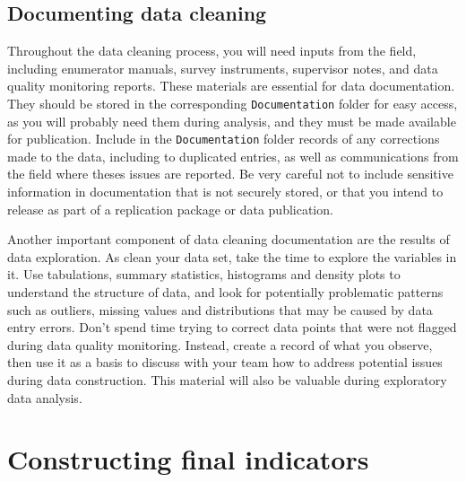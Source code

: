 \subsection{Documenting data cleaning}

Throughout the data cleaning process, you will need inputs from the field,
including enumerator manuals, survey instruments,
supervisor notes, and data quality monitoring reports.
These materials are essential for data documentation.
They should be stored in the corresponding \texttt{Documentation} folder for easy access,
as you will probably need them during analysis,
and they must be made available for publication.
Include in the \texttt{Documentation} folder records of any
corrections made to the data, including to duplicated entries,
as well as communications from the field where theses issues are reported.
Be very careful not to include sensitive information in documentation that is not securely stored,
or that you intend to release as part of a replication package or data publication.

Another important component of data cleaning documentation are the results of data exploration.
As clean your data set, take the time to explore the variables in it.
Use tabulations, summary statistics, histograms and density plots to understand the structure of data,
and look for potentially problematic patterns such as outliers,
missing values and distributions that may be caused by data entry errors.
Don't spend time trying to correct data points that were not flagged during data quality monitoring.
Instead, create a record of what you observe,
then use it as a basis to discuss with your team how to address potential issues during data construction.
This material will also be valuable during exploratory data analysis.

\section{Constructing final indicators}

